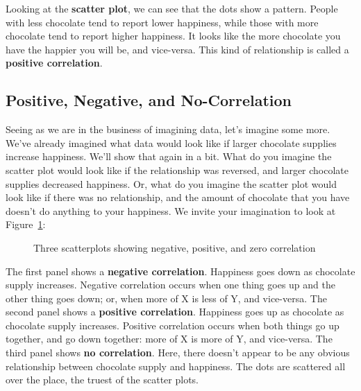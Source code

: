 \documentclass[
  letterpaper,
  DIV=11,
  numbers=noendperiod]{scrreprt}
\begin{document}
Looking at the \textbf{scatter plot}, we can see that the dots show a
pattern. People with less chocolate tend to report lower happiness,
while those with more chocolate tend to report higher happiness. It
looks like the more chocolate you have the happier you will be, and
vice-versa. This kind of relationship is called a \textbf{positive
correlation}.

\subsection{Positive, Negative, and
No-Correlation}\label{positive-negative-and-no-correlation}

Seeing as we are in the business of imagining data, let's imagine some
more. We've already imagined what data would look like if larger
chocolate supplies increase happiness. We'll show that again in a bit.
What do you imagine the scatter plot would look like if the relationship
was reversed, and larger chocolate supplies decreased happiness. Or,
what do you imagine the scatter plot would look like if there was no
relationship, and the amount of chocolate that you have doesn't do
anything to your happiness. We invite your imagination to look at
Figure~\ref{fig-3posnegrand}:

\begin{figure}


\caption{\label{fig-3posnegrand}Three scatterplots showing negative,
positive, and zero correlation}

\end{figure}%

The first panel shows a \textbf{negative correlation}. Happiness goes
down as chocolate supply increases. Negative correlation occurs when one
thing goes up and the other thing goes down; or, when more of X is less
of Y, and vice-versa. The second panel shows a \textbf{positive
correlation}. Happiness goes up as chocolate as chocolate supply
increases. Positive correlation occurs when both things go up together,
and go down together: more of X is more of Y, and vice-versa. The third
panel shows \textbf{no correlation}. Here, there doesn't appear to be
any obvious relationship between chocolate supply and happiness. The
dots are scattered all over the place, the truest of the scatter plots.
\end{document}
